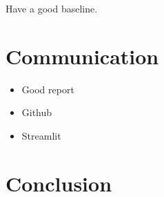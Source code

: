 \documentclass[a4paper,10pt]{article}
\begin{document}
Have a good baseline.



\section{Communication}


\begin{itemize}
  \item Good report
  \item Github
  \item Streamlit
\end{itemize}

\section{Conclusion}



\end{document}

